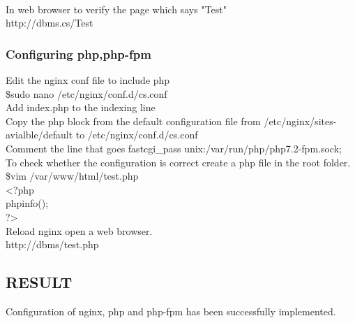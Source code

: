 \documentclass{article}
\begin{document}
\begin{flushleft}
\newpage
\begin{verbatim}
    
\end{verbatim}
\newpage
\vspace{0.2cm}
\textbullet In web browser to verify the page which says "Test"\\
\vspace{0.1in}\hspace{0.3in}http://dbms.cs/Test\\
\subsubsection{Configuring php,php-fpm}
\vspace{0.2cm}
\textbullet Edit the nginx conf file to include php\\
\vspace{0.1in}\hspace{0.3in}\$sudo nano /etc/nginx/conf.d/cs.conf\\
\vspace{0.1in}\textbullet Add index.php to the indexing line\\
\vspace{0.2cm}
\textbullet Copy the php block from the default configuration file from /etc/nginx/sites-avialble/default to /etc/nginx/conf.d/cs.conf\\
\vspace{0.2cm}
\textbullet Comment the line that goes fastcgi\_pass unix:/var/run/php/php7.2-fpm.sock;\\
\vspace{0.2cm}
\textbullet To check whether the configuration is correct create a php file in the root folder.\\
\vspace{0.1in}\hspace{0.3in}\$vim /var/www/html/test.php\\
\textless ?php\\ phpinfo(); \\?\textgreater \\
\vspace{0.2cm}
\textbullet Reload nginx open a web browser.\\
\vspace{0.1in}\hspace{0.3in} http://dbms/test.php\\
\vspace{2in}
\subsection{RESULT}
Configuration of nginx, php and php-fpm has been successfully implemented.
\end{flushleft}
\end{document}

